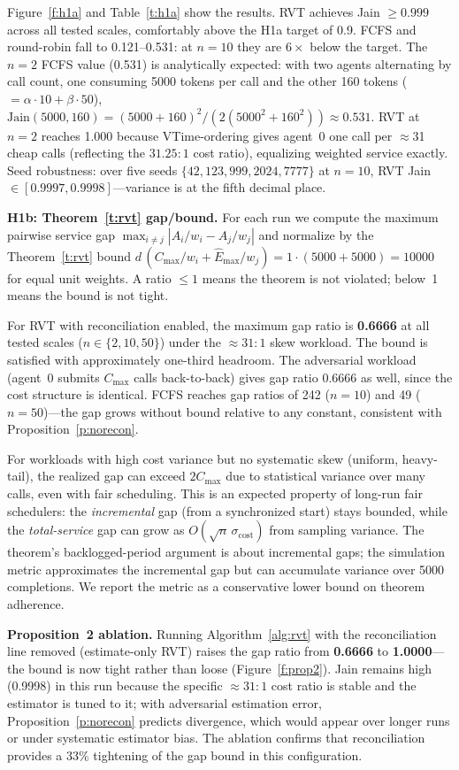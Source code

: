 \documentclass[letterpaper,11pt,leqno]{article}
\begin{document}
Figure~\ref{f:h1a} and Table~\ref{t:h1a} show the results. RVT achieves Jain $\ge 0.999$ across all tested scales, comfortably above the H1a target of 0.9. FCFS and round-robin fall to 0.121--0.531: at $n=10$ they are $6\!\times$ below the target. The $n=2$ FCFS value (0.531) is analytically expected: with two agents alternating by call count, one consuming 5000 tokens per call and the other 160 tokens ($= \alpha{\cdot}10 + \beta{\cdot}50$), $\mathrm{Jain}(5000,160) = (5000+160)^2 / (2(5000^2+160^2)) \approx 0.531$. RVT at $n=2$ reaches 1.000 because VTime-ordering gives agent~0 one call per $\approx$31 cheap calls (reflecting the $31.25\!:\!1$ cost ratio), equalizing weighted service exactly. Seed robustness: over five seeds $\{42, 123, 999, 2024, 7777\}$ at $n=10$, RVT Jain $\in [0.9997, 0.9998]$---variance is at the fifth decimal place.

\textbf{H1b: Theorem~\ref{t:rvt} gap/bound.}
For each run we compute the maximum pairwise service gap $\max_{i \ne j} |A_i/w_i - A_j/w_j|$ and normalize by the Theorem~\ref{t:rvt} bound $d\,(C_{\max}/w_i + \hat{E}_{\max}/w_j) = 1\cdot(5000+5000)=10000$ for equal unit weights. A ratio $\le 1$ means the theorem is not violated; below~1 means the bound is not tight.

For RVT with reconciliation enabled, the maximum gap ratio is \textbf{0.6666} at all tested scales ($n \in \{2,10,50\}$) under the ${\approx}31\!:\!1$ skew workload. The bound is satisfied with approximately one-third headroom. The adversarial workload (agent~0 submits $C_{\max}$ calls back-to-back) gives gap ratio 0.6666 as well, since the cost structure is identical. FCFS reaches gap ratios of 242 ($n=10$) and 49 ($n=50$)---the gap grows without bound relative to any constant, consistent with Proposition~\ref{p:norecon}.

For workloads with high cost variance but no systematic skew (uniform, heavy-tail), the realized gap can exceed $2C_{\max}$ due to statistical variance over many calls, even with fair scheduling. This is an expected property of long-run fair schedulers: the \emph{incremental} gap (from a synchronized start) stays bounded, while the \emph{total-service} gap can grow as $O(\sqrt{n}\,\sigma_{\mathrm{cost}})$ from sampling variance. The theorem's backlogged-period argument is about incremental gaps; the simulation metric approximates the incremental gap but can accumulate variance over 5000 completions. We report the metric as a conservative lower bound on theorem adherence.

\textbf{Proposition~2 ablation.} Running Algorithm~\ref{alg:rvt} with the reconciliation line removed (estimate-only RVT) raises the gap ratio from \textbf{0.6666} to \textbf{1.0000}---the bound is now tight rather than loose (Figure~\ref{f:prop2}). Jain remains high (0.9998) in this run because the specific ${\approx}31\!:\!1$ cost ratio is stable and the estimator is tuned to it; with adversarial estimation error, Proposition~\ref{p:norecon} predicts divergence, which would appear over longer runs or under systematic estimator bias. The ablation confirms that reconciliation provides a 33\% tightening of the gap bound in this configuration.
\end{document}
